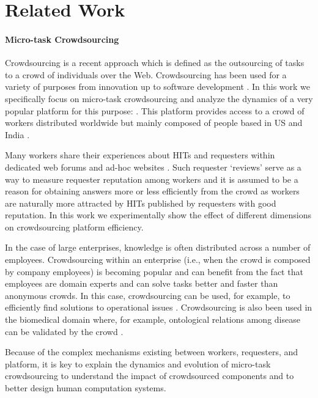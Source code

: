 \section{Related Work}\label{sec:relwork}

\paragraph{Micro-task Crowdsourcing}
Crowdsourcing is a recent approach which is defined as the  outsourcing of tasks  to a crowd of individuals over the Web. Crowdsourcing has  been used for a variety of purposes from innovation up to software development \cite{platforms}.
% 
In this work we specifically focus on micro-task crowdsourcing and analyze the dynamics of a  very popular  platform for this purpose: \amt{}. This platform provides access to a crowd of workers distributed worldwide but mainly composed of people based in US and India \cite{mturk}.

Many \amt{} workers share their experiences about HITs and requesters within dedicated web forums and ad-hoc websites \cite{turkopticon}. Such requester `reviews' serve as a way to measure requester reputation among workers and it is assumed to be a reason for obtaining answers more or less efficiently from the crowd \cite{TOreputation} as workers are naturally more attracted by HITs published by  requesters with good reputation.
% 
In this work we experimentally show the effect of different dimensions on crowdsourcing  platform   efficiency.

In the case of large enterprises,  knowledge is often distributed across a number of employees. Crowdsourcing within an enterprise (i.e., when the crowd is composed by company employees) is  becoming popular and can benefit from the fact that employees are domain experts and can solve tasks better and faster than anonymous crowds. In this case, crowdsourcing can be used, for example, to efficiently find solutions to operational issues  \cite{enterprisecrowdsourcing}. 
% 
Crowdsourcing is also been used in the biomedical domain where, for example,  ontological relations among disease can be validated by the crowd \cite{bioonto,biomedical}.

Because of the complex mechanisms existing between workers, requesters, and platform, it is key to explain the dynamics and evolution of micro-task crowdsourcing to understand  the impact of  crowdsourced components and to better design human computation systems.




